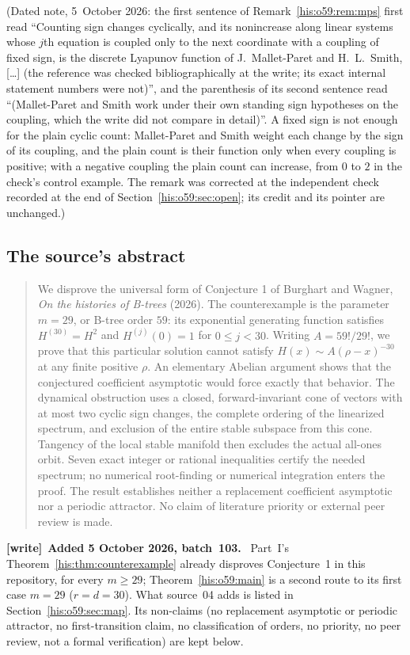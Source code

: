 \documentclass[11pt]{article}
\theoremstyle{remark}\newtheorem{remark}[theorem]{Remark}
\numberwithin{equation}{section}
\newenvironment{writenote}[1][]{\par\smallskip\begingroup\small
 \noindent\textbf{[write]}\if\relax\detokenize{#1}\relax\else~\textbf{#1.}\fi\ }%
 {\par\endgroup\smallskip}
\begin{document}
\noindent(Dated note, 5~October 2026: the first sentence of Remark~\ref{his:o59:rem:mps} first read ``Counting sign changes cyclically, and its nonincrease along linear systems whose $j$th equation is coupled only to the next coordinate with a coupling of fixed sign, is the discrete Lyapunov function of J.~Mallet-Paret and H.~L.~Smith, [\ldots] (the reference was checked bibliographically at the write; its exact internal statement numbers were not)'', and the parenthesis of its second sentence read ``(Mallet-Paret and Smith work under their own standing sign hypotheses on the coupling, which the write did not compare in detail)''. A fixed sign is not enough for the plain cyclic count: Mallet-Paret and Smith weight each change by the sign of its coupling, and the plain count is their function only when every coupling is positive; with a negative coupling the plain count can increase, from $0$ to $2$ in the check's control example. The remark was corrected at the independent check recorded at the end of Section~\ref{his:o59:sec:open}; its credit and its pointer are unchanged.)

\subsection{The source's abstract}\label{his:o59:sec:abstract}
\begin{quote}\small
We disprove the universal form of Conjecture 1 of Burghart and Wagner,
\emph{On the histories of B-trees} (2026). The counterexample is the
parameter $m=29$, or B-tree order $59$: its exponential generating
function satisfies $H^{(30)}=H^2$ and $H^{(j)}(0)=1$ for $0\le j<30$.
Writing $A=59!/29!$, we prove that this particular solution cannot satisfy
$H(x)\sim A(\rho-x)^{-30}$ at any finite positive $\rho$.
An elementary Abelian argument shows that the conjectured coefficient
asymptotic would force exactly that behavior. The dynamical obstruction
uses a closed, forward-invariant cone of vectors with at most two cyclic
sign changes, the complete ordering of the linearized spectrum, and
exclusion of the entire stable subspace from this cone. Tangency of the
local stable manifold then excludes the actual all-ones orbit. Seven
exact integer or rational inequalities certify the needed spectrum;
no numerical root-finding or numerical integration enters the proof.
The result establishes neither a replacement coefficient asymptotic
nor a periodic attractor. No claim of literature priority or external
peer review is made.
\end{quote}
\begin{writenote}[Added 5 October 2026, batch~103]
Part~I's Theorem~\ref{his:thm:counterexample} already disproves Conjecture~1 in this repository, for every $m\ge29$; Theorem~\ref{his:o59:main} is a second route to its first case $m=29$ ($r=d=30$). What source~04 adds is listed in Section~\ref{his:o59:sec:map}. Its non-claims (no replacement asymptotic or periodic attractor, no first-transition claim, no classification of orders, no priority, no peer review, not a formal verification) are kept below.
\end{writenote}
\end{document}
